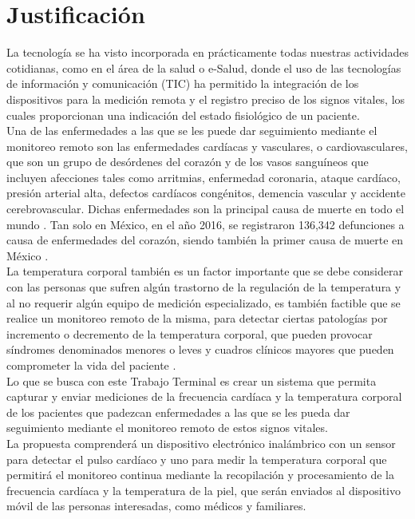 \section{Justificación}
La tecnología se ha visto incorporada en prácticamente todas nuestras actividades cotidianas, como en el área de la salud o e-Salud, donde el uso de las tecnologías de información y comunicación (TIC) ha permitido la integración de los dispositivos para la medición remota y el registro preciso de los signos vitales, los cuales proporcionan una indicación del estado fisiológico de un paciente.\\

Una de las enfermedades a las que se les puede dar seguimiento mediante el monitoreo remoto son las enfermedades cardíacas y vasculares, o cardiovasculares, que son un grupo de desórdenes del corazón y de los vasos sanguíneos que incluyen afecciones tales como arritmias, enfermedad coronaria, ataque cardíaco, presión arterial alta, defectos cardíacos congénitos, demencia vascular y accidente cerebrovascular. Dichas enfermedades son la principal causa de muerte en todo el mundo \cite{who2017}.  Tan solo en México, en el año 2016, se registraron 136,342 defunciones a causa de enfermedades del corazón, siendo también la primer causa de muerte en México \cite{inegiMortalidad}.\\

La temperatura corporal también es un factor importante que se debe considerar con las personas que sufren algún trastorno de la regulación de la temperatura y al no requerir algún equipo de medición especializado, es también factible que se realice un monitoreo remoto de la misma, para detectar ciertas patologías por incremento o decremento de la temperatura corporal, que pueden provocar síndromes denominados menores o leves y cuadros clínicos mayores que pueden comprometer la vida del paciente \cite{lizarralde2000}.\\

Lo que se busca con este Trabajo Terminal es crear un sistema que permita capturar y enviar mediciones de la frecuencia cardíaca y la temperatura corporal de los pacientes que padezcan enfermedades a las que se les pueda dar seguimiento mediante el monitoreo remoto de estos signos vitales.\\

La propuesta comprenderá un dispositivo electrónico inalámbrico con un sensor para detectar el pulso cardíaco y uno para medir la temperatura corporal que permitirá el monitoreo continua mediante la recopilación y procesamiento de la frecuencia cardíaca y la temperatura de la piel, que serán enviados al dispositivo móvil de las personas interesadas, como médicos y familiares.

